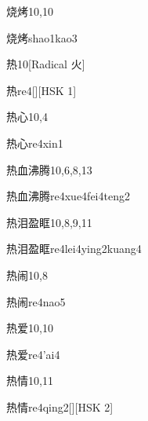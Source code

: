 \begin{entry}{烧烤}{10,10}
  \begin{phonetics}{烧烤}{shao1kao3}
  \end{phonetics}
\end{entry}

\begin{entry}{热}{10}[Radical 火]
  \begin{phonetics}{热}{re4}[][HSK 1]
  \end{phonetics}
\end{entry}

\begin{entry}{热心}{10,4}
  \begin{phonetics}{热心}{re4xin1}
  \end{phonetics}
\end{entry}

\begin{entry}{热血沸腾}{10,6,8,13}
  \begin{phonetics}{热血沸腾}{re4xue4fei4teng2}
  \end{phonetics}
\end{entry}

\begin{entry}{热泪盈眶}{10,8,9,11}
  \begin{phonetics}{热泪盈眶}{re4lei4ying2kuang4}
  \end{phonetics}
\end{entry}

\begin{entry}{热闹}{10,8}
  \begin{phonetics}{热闹}{re4nao5}
  \end{phonetics}
\end{entry}

\begin{entry}{热爱}{10,10}
  \begin{phonetics}{热爱}{re4'ai4}
  \end{phonetics}
\end{entry}

\begin{entry}{热情}{10,11}
  \begin{phonetics}{热情}{re4qing2}[][HSK 2]
  \end{phonetics}
\end{entry}

